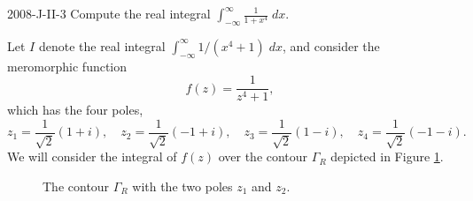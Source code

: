 \documentclass{article}
\begin{document}
	\begin{prb}{2008-J-II-3}
		Compute the real integral $\int_{-\infty}^{\infty}\frac{1}{1 + x^{4}}\;dx$. 
	\end{prb}
	Let $I$ denote the real integral $\int_{-\infty}^{\infty}1/(x^{4} + 1)\;dx$, and consider the meromorphic function 
	\begin{equation*}
		f(z) = \frac{1}{z^{4} + 1}, 
	\end{equation*}
	which has the four poles, 
	\begin{equation*}
		z_{1} = \frac{1}{\sqrt{2}}(1 + i), \quad z_{2} = \frac{1}{\sqrt{2}}(-1 + i), \quad z_{3} =\frac{1}{\sqrt{2}}(1 -i), \quad z_{4} = \frac{1}{\sqrt{2}}(-1 -i). 
	\end{equation*}
	We will consider the integral of $f(z)$ over the contour $\Gamma_{R}$ depicted in Figure \ref{fig:2008JII3}. 
	\begin{figure}[h!]
		\centering 
		\caption{The contour $\Gamma_{R}$ with the two poles $z_{1}$ and $z_{2}$.}
		\label{fig:2008JII3}
	\end{figure}
	
\end{document}
